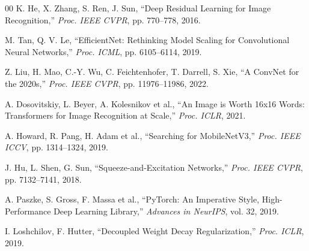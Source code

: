 \documentclass[conference]{IEEEtran}
\begin{document}
\begin{thebibliography}{00}
K. He, X. Zhang, S. Ren, J. Sun,
``Deep Residual Learning for Image Recognition,''
\textit{Proc. IEEE CVPR}, pp. 770--778, 2016.

M. Tan, Q. V. Le,
``EfficientNet: Rethinking Model Scaling for Convolutional Neural Networks,''
\textit{Proc. ICML}, pp. 6105--6114, 2019.

Z. Liu, H. Mao, C.-Y. Wu, C. Feichtenhofer, T. Darrell, S. Xie,
``A ConvNet for the 2020s,''
\textit{Proc. IEEE CVPR}, pp. 11976--11986, 2022.

A. Dosovitskiy, L. Beyer, A. Kolesnikov et al.,
``An Image is Worth 16x16 Words: Transformers for Image Recognition at Scale,''
\textit{Proc. ICLR}, 2021.

A. Howard, R. Pang, H. Adam et al.,
``Searching for MobileNetV3,''
\textit{Proc. IEEE ICCV}, pp. 1314--1324, 2019.

J. Hu, L. Shen, G. Sun,
``Squeeze-and-Excitation Networks,''
\textit{Proc. IEEE CVPR}, pp. 7132--7141, 2018.

A. Paszke, S. Gross, F. Massa et al.,
``PyTorch: An Imperative Style, High-Performance Deep Learning Library,''
\textit{Advances in NeurIPS}, vol. 32, 2019.

I. Loshchilov, F. Hutter,
``Decoupled Weight Decay Regularization,''
\textit{Proc. ICLR}, 2019.
\end{thebibliography}
\end{document}
